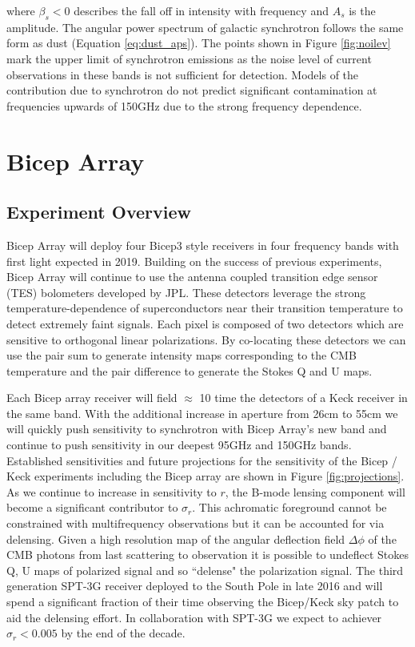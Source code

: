 \documentclass[12pt]{article}
\begin{document}
where $\beta _s < 0$ describes the fall off in intensity with frequency and
$A_s$ is the amplitude. The angular power spectrum of galactic synchrotron
follows the same form as dust (Equation \ref{eq:dust_aps}). The points shown
in Figure \ref{fig:noilev} mark the upper limit of synchrotron emissions as
the noise level of current observations in these bands is not sufficient for
detection. Models of the contribution due to synchrotron do not predict
significant contamination at frequencies upwards of 150GHz due to the strong
frequency dependence.


\section{Bicep Array}

\subsection{Experiment Overview}
Bicep Array will deploy four Bicep3 style receivers in four frequency bands
with first light expected in 2019. Building on the success of previous
experiments, Bicep Array will continue to use the antenna coupled transition
edge sensor (TES) bolometers developed by JPL. These detectors leverage the strong
temperature-dependence of superconductors near their transition temperature to
detect extremely faint signals. Each pixel is composed of two detectors which
are sensitive to orthogonal linear polarizations. By co-locating these
detectors we can use the pair sum to generate intensity maps corresponding to
the CMB temperature and the pair difference to generate the Stokes Q and U
maps.

Each Bicep array receiver will field $\approx$ 10 time the detectors of a Keck
receiver in the same band. With the additional increase in aperture from 26cm to
55cm we will quickly push sensitivity to synchrotron with Bicep Array's new band
and continue to push sensitivity in our deepest 95GHz and 150GHz bands.
Established sensitivities and future projections for the sensitivity of the
Bicep / Keck experiments including the Bicep array are shown in Figure
\ref{fig:projections}. As we continue to increase in sensitivity to $r$, the
B-mode lensing component will become a significant contributor to $\sigma _r$.
This achromatic foreground cannot be constrained with multifrequency
observations but it can be accounted for via delensing. Given a high
resolution map of the angular deflection field $\Delta \phi$ of the CMB
photons from last scattering to observation it is possible to undeflect Stokes
Q, U maps of polarized signal and so ``delense" the polarization signal. The
third generation SPT-3G receiver deployed to the South Pole in late 2016 and
will spend a significant fraction of their time observing the Bicep/Keck sky
patch to aid the delensing effort. In collaboration with SPT-3G we expect to achiever
$\sigma _r <0.005$ by the end of the decade.
\end{document}
